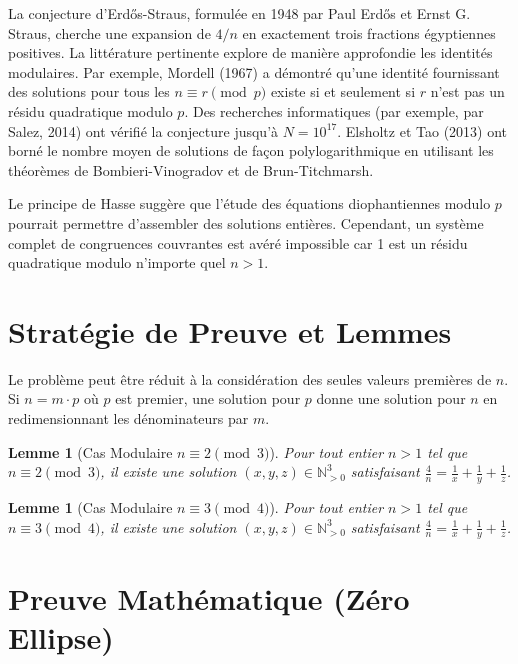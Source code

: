 \documentclass[11pt,a4paper]{article}
\newtheorem{lemma}[theorem]{Lemme}
\begin{document}
La conjecture d'Erd\H{o}s-Straus, formul\'ee en 1948 par Paul Erd\H{o}s et Ernst G. Straus, cherche une expansion de $4/n$ en exactement trois fractions \'egyptiennes positives.
La litt\'erature pertinente explore de mani\`ere approfondie les identit\'es modulaires. Par exemple, Mordell (1967) a d\'emontr\'e qu'une identit\'e fournissant des solutions pour tous les $n \equiv r \pmod p$ existe si et seulement si $r$ n'est pas un r\'esidu quadratique modulo $p$.
Des recherches informatiques (par exemple, par Salez, 2014) ont v\'erifi\'e la conjecture jusqu'\`a $N = 10^{17}$.
Elsholtz et Tao (2013) ont born\'e le nombre moyen de solutions de fa\c{c}on polylogarithmique en utilisant les th\'eor\`emes de Bombieri-Vinogradov et de Brun-Titchmarsh.

Le principe de Hasse sugg\`ere que l'\'etude des \'equations diophantiennes modulo $p$ pourrait permettre d'assembler des solutions enti\`eres. Cependant, un syst\`eme complet de congruences couvrantes est av\'er\'e impossible car 1 est un r\'esidu quadratique modulo n'importe quel $n > 1$.

\section{Strat\'egie de Preuve et Lemmes}

Le probl\`eme peut \^etre r\'eduit \`a la consid\'eration des seules valeurs premi\`eres de $n$. Si $n = m \cdot p$ o\`u $p$ est premier, une solution pour $p$ donne une solution pour $n$ en redimensionnant les d\'enominateurs par $m$.

\begin{lemma}[Cas Modulaire $n \equiv 2 \pmod 3$]
Pour tout entier $n > 1$ tel que $n \equiv 2 \pmod 3$, il existe une solution $(x,y,z) \in \mathbb{N}_{>0}^3$ satisfaisant $\frac{4}{n} = \frac{1}{x} + \frac{1}{y} + \frac{1}{z}$.
\end{lemma}

\begin{lemma}[Cas Modulaire $n \equiv 3 \pmod 4$]
Pour tout entier $n > 1$ tel que $n \equiv 3 \pmod 4$, il existe une solution $(x,y,z) \in \mathbb{N}_{>0}^3$ satisfaisant $\frac{4}{n} = \frac{1}{x} + \frac{1}{y} + \frac{1}{z}$.
\end{lemma}

\section{Preuve Math\'ematique (Z\'ero Ellipse)}
\end{document}
